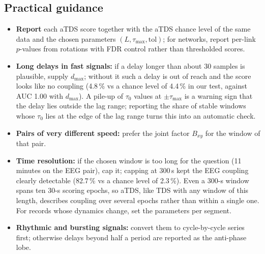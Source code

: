 \documentclass[11pt,a4paper]{article}
\begin{document}
\subsection*{Practical guidance}
\label{sec:guidance}
\begin{itemize}
\item \textbf{Report} each aTDS score together with the aTDS chance level of the same data and the chosen parameters $(L, \tau_{\max}, \mathrm{tol})$; for networks, report per-link $p$-values from rotations with FDR control rather than thresholded scores.
\item \textbf{Long delays in fast signals:} if a delay longer than about 30 samples is plausible, supply $d_{\max}$; without it such a delay is out of reach and the score looks like no coupling (4.8\,\% vs a chance level of 4.4\,\% in our test, against AUC 1.00 with $d_{\max}$). A pile-up of $\tau_0$ values at $\pm\tau_{\max}$ is a warning sign that the delay lies outside the lag range; reporting the share of stable windows whose $\tau_0$ lies at the edge of the lag range turns this into an automatic check.
\item \textbf{Pairs of very different speed:} prefer the joint factor $B_{xy}$ for the window of that pair.
\item \textbf{Time resolution:} if the chosen window is too long for the question (11 minutes on the EEG pair), cap it; capping at 300\,s kept the EEG coupling clearly detectable (82.7\,\% vs a chance level of 2.3\,\%). Even a 300-s window spans ten 30-s scoring epochs, so aTDS, like TDS with any window of this length, describes coupling over several epochs rather than within a single one. For records whose dynamics change, set the parameters per segment.
\item \textbf{Rhythmic and bursting signals:} convert them to cycle-by-cycle series first; otherwise delays beyond half a period are reported as the anti-phase lobe.
\end{itemize}
\end{document}
